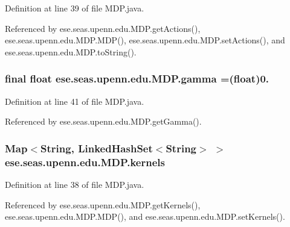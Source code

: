 Definition at line 39 of file M\+D\+P.\+java.



Referenced by ese.\+seas.\+upenn.\+edu.\+M\+D\+P.\+get\+Actions(), ese.\+seas.\+upenn.\+edu.\+M\+D\+P.\+M\+D\+P(), ese.\+seas.\+upenn.\+edu.\+M\+D\+P.\+set\+Actions(), and ese.\+seas.\+upenn.\+edu.\+M\+D\+P.\+to\+String().

\hypertarget{classese_1_1seas_1_1upenn_1_1edu_1_1_m_d_p_aaf5ea15587eab978e973ffad523ffc16}{}
\subsubsection[{gamma}]{\setlength{\rightskip}{0pt plus 5cm}final float ese.\+seas.\+upenn.\+edu.\+M\+D\+P.\+gamma =(float)0.\hspace{0.3cm}{\ttfamily [private]}}\label{classese_1_1seas_1_1upenn_1_1edu_1_1_m_d_p_aaf5ea15587eab978e973ffad523ffc16}


Definition at line 41 of file M\+D\+P.\+java.



Referenced by ese.\+seas.\+upenn.\+edu.\+M\+D\+P.\+get\+Gamma().

\hypertarget{classese_1_1seas_1_1upenn_1_1edu_1_1_m_d_p_a3bbc6750e60a6563cbcb7ff6f5035bfc}{}
\subsubsection[{kernels}]{\setlength{\rightskip}{0pt plus 5cm}Map$<$String, Linked\+Hash\+Set$<$String$>$ $>$ ese.\+seas.\+upenn.\+edu.\+M\+D\+P.\+kernels\hspace{0.3cm}{\ttfamily [private]}}\label{classese_1_1seas_1_1upenn_1_1edu_1_1_m_d_p_a3bbc6750e60a6563cbcb7ff6f5035bfc}


Definition at line 38 of file M\+D\+P.\+java.



Referenced by ese.\+seas.\+upenn.\+edu.\+M\+D\+P.\+get\+Kernels(), ese.\+seas.\+upenn.\+edu.\+M\+D\+P.\+M\+D\+P(), and ese.\+seas.\+upenn.\+edu.\+M\+D\+P.\+set\+Kernels().

\hypertarget{classese_1_1seas_1_1upenn_1_1edu_1_1_m_d_p_ab06e750b3f8875deaacb13a575fcde5e}{}
